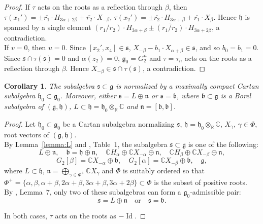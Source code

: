 \documentclass[10pt]{article}
\newtheorem{corollary}[theorem]{Corollary}
\begin{document}
\begin{proof}
If $\tau$ acts on the roots as a reflection through $\beta$, then $\tau (x_1')=\pm\overline{r_1}\cdot H_{3\alpha +2\beta }+ \overline{r_2}\cdot X_{-\beta}$, $\tau (x_2')=\pm\overline{r_2}\cdot H_{3\alpha +\beta }+ \overline{r_1}\cdot X_{\beta}$. Hence $\mathfrak{h}$ is spanned by a single element $\left( r_1/r_2 \right) \cdot H_{3\alpha + \beta}\pm \overline{\left( r_1/r_2 \right) } \cdot H_{3\alpha +2\beta }$, a contradiction.\\

If $v=0$, then $u=0$. Since $[x_2',x_4]\in \mathfrak{s}$, $X_{-\beta}-b_1\cdot X_{\alpha +\beta}\in \mathfrak{s}$, and so $b_0=b_1=0$. Since $\mathfrak{s}\cap \tau (\mathfrak{s})=0$ and $\alpha (z_2)=0$, $\mathfrak{g}_0=G_2^n$ and $\tau = \tau _n$ acts on the roots as a reflection through $\beta$. Hence $X_{-\beta}\in \mathfrak{s}\cap \tau (\mathfrak{s})$, a contradiction. 

\end{proof}

\begin{corollary}\label{corollary:L}
The subalgebra $\mathfrak{s}\subset \mathfrak{g}$ is normalized by a maximally compact Cartan subalgebra $\mathfrak{h}_0\subset \mathfrak{g}_0$. Moreover, either $\mathfrak{s}=L\oplus \mathfrak{n}$ or $\mathfrak{s}=\mathfrak{b}$, where $\mathfrak{b}\subset \mathfrak{g}$ is a Borel subalgebra of $(\mathfrak{g},\mathfrak{h})$, $L\subset \mathfrak{h}=\mathfrak{h}_0\otimes_{\mathbb R}\mathbb C$ and $\mathfrak{n}=[\mathfrak{b},\mathfrak{b}]$.
\end{corollary}

\begin{proof}

Let $\mathfrak{h}_0\subset \mathfrak{g}_0$ be a Cartan subalgebra normalizing $\mathfrak{s}$, $\mathfrak{h}=\mathfrak{h}_0\otimes_{\mathbb R}\mathbb C$, $X_{\gamma}$, $\gamma \in \Phi$, root vectors of $(\mathfrak{g},\mathfrak{h})$.\\

By Lemma~\ref{lemma:L} and \cite{Mayanskiy}, Table~$1$, the subalgebra $\mathfrak{s}\subset \mathfrak{g}$ is one of the following:
$$
L\oplus \mathfrak{n},\quad \mathfrak{b}=\mathfrak{h}\oplus \mathfrak{n},\quad \mathbb C H_{\alpha}\oplus \mathbb C X_{-\alpha}\oplus \mathfrak{n},\quad \mathbb C H_{\beta}\oplus \mathbb C X_{-\beta}\oplus \mathfrak{n},
$$
$$
G_2[\beta]=\mathbb C X_{-\alpha}\oplus \mathfrak{b},\quad G_2[\alpha]=\mathbb C X_{-\beta}\oplus \mathfrak{b}, \quad \mathfrak{g},
$$
where $L\subset \mathfrak{h}$, $\mathfrak{n}=\bigoplus\limits_{\gamma \in {\Phi}^{+}}\mathbb C X_{\gamma}$ and $\Phi$ is suitably ordered so that ${\Phi}^{+} = \{ \alpha , \beta , \alpha +\beta , 2\alpha +\beta , 3\alpha +\beta , 3\alpha +2\beta \} \subset \Phi$ is the subset of positive roots.\\

By \cite{Liana}, Lemma~$7$, only two of these subalgebras can form a $\mathfrak{g}_0$-admissible pair:
$$
\mathfrak{s}=L\oplus \mathfrak{n} \quad \mbox{or}\quad \mathfrak{s}=\mathfrak{b}.
$$

In both cases, $\tau$ acts on the roots as $-\operatorname{Id}$.

\end{proof}
\end{document}
